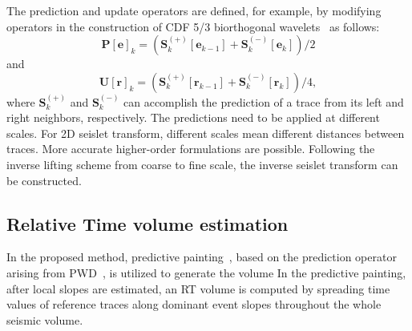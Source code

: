     The prediction and update operators are defined, for example, by modifying 
    operators in the construction of CDF 5/3 biorthogonal 
    wavelets~\cite[]{Cohen1992} as follows:
    \begin{equation}
        \label{P}
        \mathbf{P[e]}_k = \left(\mathbf{S}_k^{(+)}[\mathbf{e}_{k-1}]+
        \mathbf{S}_k^{(-)}[\mathbf{e}_{k}] \right) / 2
    \end{equation}
    and
    \begin{equation}
        \label{U}
        \mathbf{U[r]}_k = \left(\mathbf{S}_k^{(+)}[\mathbf{r}_{k-1}]+
        \mathbf{S}_k^{(-)}[\mathbf{r}_{k}] \right) / 4,
    \end{equation}
    where $\mathbf{S}_k^{(+)}$ and $\mathbf{S}_k^{(-)}$ can accomplish the 
    prediction of a trace from its left and right neighbors, respectively. 
    The predictions need to be applied at different scales. 
    For 2D seislet transform, different scales mean different distances 
    between traces. 
    More accurate higher-order formulations are possible. 
    Following the inverse lifting scheme from coarse to fine scale, 
    the inverse seislet transform can be constructed.

\subsection{Relative Time volume estimation}
    In the proposed method, predictive painting~\cite[]{Fomel2010b}, based on the prediction operator arising from PWD~\cite[]{Fomel2002}, is 
    utilized to generate the  volume\old{,} 
    In the predictive painting, after local slopes are estimated, an RT 
    volume is computed by spreading time values of reference traces along 
    dominant event slopes throughout the whole seismic volume.


